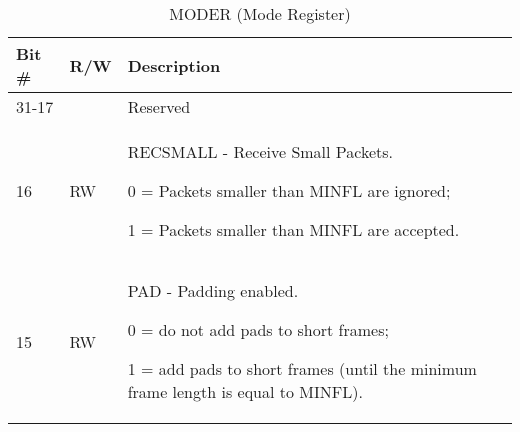\begin{table}[H]
  \centering
  \begin{tabularx}{\textwidth}{|l|l|X|}
    
    \hline
    \rowcolor{iob-green}
    {\bf Bit \#} & {\bf R/W} & {\bf Description} \\ \hline

    31-17   &   & Reserved \\ \hline
    \rowcolor{iob-blue}
    16      & RW & RECSMALL - Receive Small Packets. 

                0 = Packets smaller than MINFL are ignored; 

                1 = Packets smaller than MINFL are accepted. \\ \hline
    15      & RW &   PAD - Padding enabled. 

                0 = do not add pads to short frames; 

                1 = add pads to short frames (until the minimum frame length is equal to MINFL). \\ \hline
  \end{tabularx}
    \caption{MODER (Mode Register)}
  \label{swreg_details:moder}
\end{table}
